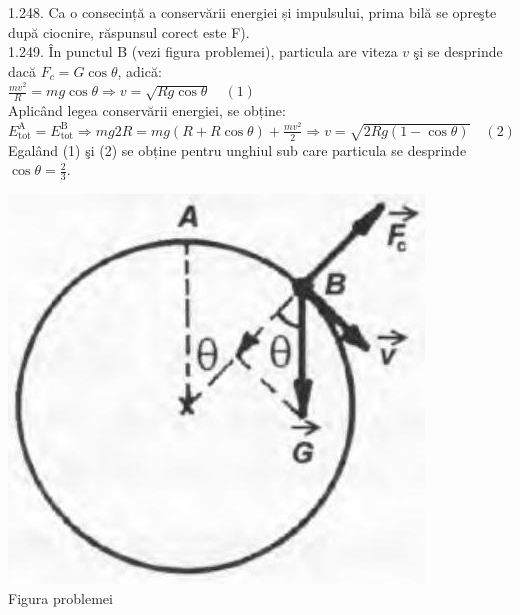 1.248. Ca o consecință a conservării energiei și impulsului, prima bilă se opreşte după ciocnire, răspunsul corect este F).\\

1.249. În punctul B (vezi figura problemei), particula are viteza $v$ şi se desprinde dacă $F_{c}=G \cos \theta$, adică:\\ $\frac{m v^{2}}{R}=m g \cos \theta \Rightarrow v=\sqrt{R g \cos \theta} \quad (1)$\\ Aplicând legea conservării energiei, se obține:\\ $E_{\text {tot}}^{\mathrm{A}}=E_{\text {tot}}^{\mathrm{B}} \Rightarrow m g 2 R=m g(R+R \cos \theta)+\frac{m v^{2}}{2} \Rightarrow v=\sqrt{2 R g(1-\cos \theta)} \quad (2)$\\ Egalând (1) şi (2) se obține pentru unghiul sub care particula se desprinde $\cos \theta=\frac{2}{3}$.\\ \begin{center} \includegraphics[width=0.4\linewidth]{images/2025_07_01_5b3ff9fa0d508c8e9f17g-250(1)}\\ Figura problemei \end{center}\\

